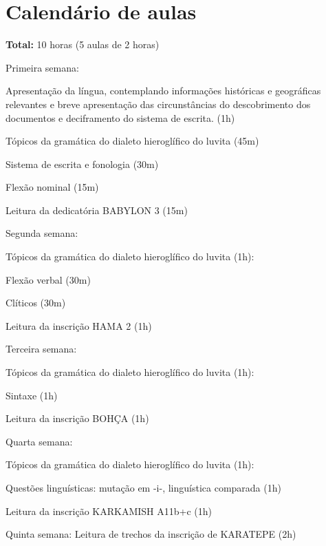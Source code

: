 \documentclass[article,12pt]{memoir}
\begin{document}
\chapter{Calendário de aulas}

\textbf{Total:} 10 horas (5 aulas de 2 horas)

\begin{compactitem}
	\item Primeira semana:
	\begin{compactitem}
		\item Apresentação da língua, contemplando informações históricas e
		geográficas relevantes e breve apresentação das circunstâncias do
		descobrimento dos documentos e deciframento do sistema de escrita.
		(1h)
		\item Tópicos da gramática do dialeto hieroglífico do luvita (45m)

		\begin{compactitem}
			\item Sistema de escrita e fonologia (30m)
			\item Flexão nominal (15m)
		\end{compactitem}
		\item Leitura da dedicatória BABYLON 3 (15m)
	\end{compactitem}
	\item Segunda semana:

	\begin{compactitem}
		\item Tópicos da gramática do dialeto hieroglífico do luvita (1h):
		\begin{compactitem}
			\item Flexão verbal (30m)
			\item Clíticos (30m)
		\end{compactitem}
		\item Leitura da inscrição HAMA 2 (1h)
	\end{compactitem}
	\item Terceira semana:
	\begin{compactitem}
		\item Tópicos da gramática do dialeto hieroglífico do luvita (1h):
		\begin{compactitem}
			\item Sintaxe (1h)
		\end{compactitem}
		\item Leitura da inscrição BOHÇA (1h)
	\end{compactitem}
	\item Quarta semana:
	\begin{compactitem}
		\item Tópicos da gramática do dialeto hieroglífico do luvita (1h):
		\begin{compactitem}
			\item Questões linguísticas: mutação em -i-, linguística comparada (1h)
		\end{compactitem}
		\item Leitura da inscrição KARKAMISH A11b+c (1h)
	\end{compactitem}
	\item Quinta semana: Leitura de trechos da inscrição de KARATEPE (2h)
\end{compactitem}


\nocite{
	Velhartická2016,
	Payne2010,
	Payne2012,
	CHLI_1_1,
	CHLI_1_2,
	CHLI_1_3,
	CHLI_2,
	CHLI_3,
	Mouton2013,
	Yakubovich2010,
	Melchert2003
}

\printbibliography%
\end{document}
